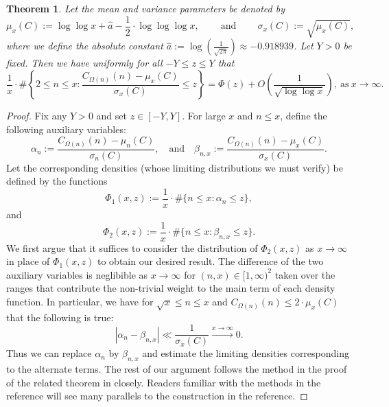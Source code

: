 \documentclass[11pt,reqno,a4letter]{article}
\numberwithin{figure}{section}
\numberwithin{table}{section}
\theoremstyle{plain}
\newtheorem{theorem}{Theorem}
\numberwithin{theorem}{section}
\theoremstyle{definition}
\begin{document}
\begin{theorem} 
\label{theorem_CLT_VI} 
Let the mean and variance parameters be denoted by 
\[
\mu_x(C) := \log\log x + \hat{a} - \frac{1}{2} \cdot \log\log\log x, 
     \qquad \mathrm{\ and\ } \qquad 
     \sigma_x(C) := \sqrt{\mu_x(C)}, 
\]
where we define the absolute constant 
$\hat{a} := \log\left(\frac{1}{\sqrt{2\pi}}\right) \approx -0.918939$. 
Let $Y > 0$ be fixed. 
Then we have uniformly for all $-Y \leq z \leq Y$ that 
\[
\frac{1}{x} \cdot \#\left\{2 \leq n \leq x: 
     \frac{C_{\Omega(n)}(n) - \mu_x(C)}{\sigma_x(C)} \leq z\right\} = 
     \Phi(z) + O\left(\frac{1}{\sqrt{\log\log x}}\right), 
     \mathrm{\ as\ } x \rightarrow \infty. 
\] 
\end{theorem} 
\begin{proof} 
Fix any $Y > 0$ and set $z \in [-Y, Y]$. 
For large $x$ and $n \leq x$, define the following auxiliary variables: 
\[
\alpha_n := \frac{C_{\Omega(n)}(n) - \mu_n(C)}{\sigma_n(C)}, \quad\mathrm{and}\quad 
     \beta_{n,x} := \frac{C_{\Omega(n)}(n) - \mu_x(C)}{\sigma_x(C)}. 
\] 
Let the corresponding densities (whose limiting distributions we must verify) 
be defined by the functions 
\[
\Phi_1(x, z) := \frac{1}{x} \cdot \#\{n \leq x: \alpha_n \leq z\}, 
\]
and 
\[
\Phi_2(x, z) := \frac{1}{x} \cdot \#\{n \leq x: \beta_{n,x} \leq z\}. 
\] 
We first argue that it suffices to consider the distribution of $\Phi_2(x, z)$ as 
$x \rightarrow \infty$ in place of $\Phi_1(x, z)$ to obtain our desired result. 
The difference of the two auxiliary variables is neglibible as 
$x \rightarrow \infty$ for $(n,x) \in [1, \infty)^2$ 
taken over the ranges that contribute the non-trivial 
weight to the main term of each density function. In particular, we have for 
$\sqrt{x} \leq n \leq x$ and $C_{\Omega(n)}(n) \leq 2 \cdot \mu_x(C)$ that the 
following is true: 
\[
|\alpha_n - \beta_{n,x}| \ll \frac{1}{\sigma_x(C)} \xrightarrow{x \rightarrow \infty} 0. 
\]
Thus we can replace $\alpha_n$ by $\beta_{n,x}$ and estimate the limiting 
densities corresponding to the alternate terms. 
The rest of our argument follows the method in the proof of the related theorem in 
\cite[Thm.\ 7.21; \S 7.4]{MV} closely. Readers familiar with the methods in the 
reference will see many parallels to the construction in the reference. 


\end{proof}
\end{document}
